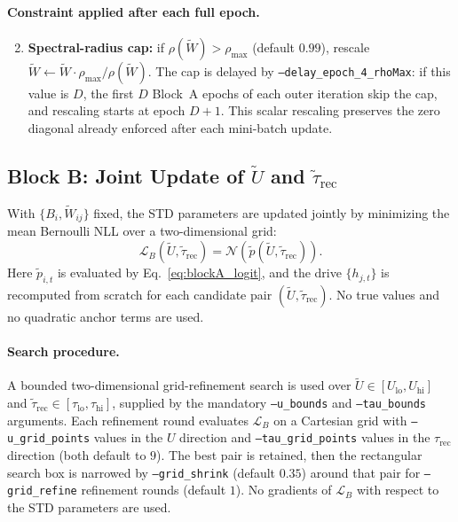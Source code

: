 \documentclass[11pt]{article}
\begin{document}
\paragraph{Constraint applied after each full epoch.}
\begin{enumerate}
    \setcounter{enumi}{1}
    \item \textbf{Spectral-radius cap:} if $\rho(\tilde{W})>\rho_\text{max}$
          (default $0.99$), rescale
          $\tilde{W}\leftarrow\tilde{W}\cdot\rho_\text{max}/\rho(\tilde{W})$.
          The cap is delayed by \texttt{--delay\_epoch\_4\_rhoMax}: if this
          value is $D$, the first $D$ Block~A epochs of each outer iteration
          skip the cap, and rescaling starts at epoch $D+1$.
          This scalar rescaling preserves the zero diagonal already enforced
          after each mini-batch update.
\end{enumerate}

\subsection{Block B: Joint Update of $\tilde{U}$ and $\tilde{\tau}_\text{rec}$}
\label{sec:block_b}

With $\{B_i,\tilde{W}_{ij}\}$ fixed, the STD parameters are updated jointly by
minimizing the mean Bernoulli NLL over a two-dimensional grid:
\begin{equation}
\mathcal{L}_B(\tilde{U},\tilde{\tau}_\text{rec})
=
\mathcal{N}(\tilde{p}(\tilde{U},\tilde{\tau}_\text{rec})).
\label{eq:blockB_loss}
\end{equation}
Here $\tilde{p}_{i,t}$ is evaluated by Eq.~\eqref{eq:blockA_logit}, and the
drive $\{h_{j,t}\}$ is recomputed from scratch for each candidate pair
$(\tilde{U},\tilde{\tau}_\text{rec})$. No true values and no quadratic anchor
terms are used.

\paragraph{Search procedure.}
A bounded two-dimensional grid-refinement search is used over
$\tilde{U}\in[U_\text{lo},U_\text{hi}]$ and
$\tilde{\tau}_\text{rec}\in[\tau_\text{lo},\tau_\text{hi}]$, supplied by the
mandatory \texttt{--u\_bounds} and \texttt{--tau\_bounds} arguments.
Each refinement round evaluates $\mathcal{L}_B$ on a Cartesian grid with
\texttt{--u\_grid\_points} values in the $U$ direction and
\texttt{--tau\_grid\_points} values in the $\tau_\text{rec}$ direction
(both default to $9$). The best pair is retained, then the rectangular search
box is narrowed by \texttt{--grid\_shrink} (default $0.35$) around that pair
for \texttt{--grid\_refine} refinement rounds (default $1$).
No gradients of $\mathcal{L}_B$ with respect to the STD parameters are used.
\end{document}
